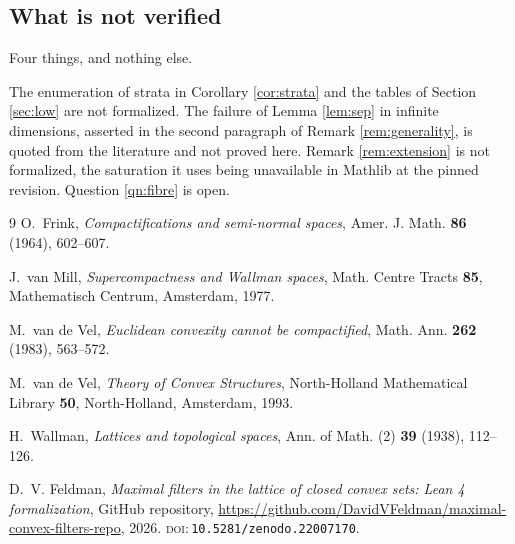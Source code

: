 \documentclass[11pt]{amsart}
\theoremstyle{plain}
\theoremstyle{definition}
\begin{document}
\subsection*{What is not verified}
Four things, and nothing else.

The enumeration of strata in Corollary \ref{cor:strata} and the tables of Section \ref{sec:low} are not formalized. The failure of Lemma \ref{lem:sep} in infinite dimensions, asserted in the second paragraph of Remark \ref{rem:generality}, is quoted from the literature and not proved here. Remark \ref{rem:extension} is not formalized, the saturation it uses being unavailable in Mathlib at the pinned revision. Question \ref{qn:fibre} is open.

\begin{thebibliography}{9}
O.~Frink, \emph{Compactifications and semi-normal spaces}, Amer. J. Math. \textbf{86} (1964), 602--607.

J.~van Mill, \emph{Supercompactness and Wallman spaces}, Math. Centre Tracts \textbf{85}, Mathematisch Centrum, Amsterdam, 1977.

M.~van de Vel, \emph{Euclidean convexity cannot be compactified}, Math. Ann. \textbf{262} (1983), 563--572.

M.~van de Vel, \emph{Theory of Convex Structures}, North-Holland Mathematical Library \textbf{50}, North-Holland, Amsterdam, 1993.

H.~Wallman, \emph{Lattices and topological spaces}, Ann. of Math. (2) \textbf{39} (1938), 112--126.

D.~V. Feldman, \emph{Maximal filters in the lattice of closed convex sets: Lean 4 formalization}, GitHub repository, \url{https://github.com/DavidVFeldman/maximal-convex-filters-repo}, 2026. \textsc{doi:}\,\allowbreak\texttt{10.5281/zenodo.22007170}.
\end{thebibliography}
\end{document}
